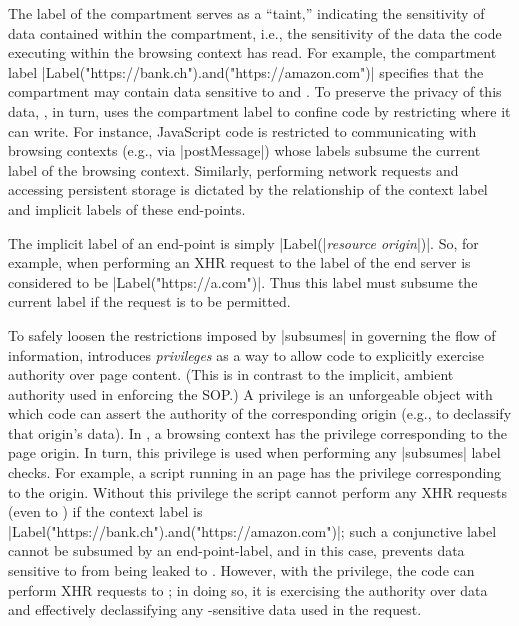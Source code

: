 The label of the compartment serves as a ``taint,'' indicating the
sensitivity of data contained within the compartment, i.e., the
sensitivity of the data the code executing within the browsing context
has read.
%
For example, the compartment label
\js|Label("https://bank.ch").and("https://amazon.com")| specifies that
the compartment may contain data sensitive to  and
.
%
To preserve the privacy of this data, \sys{}, in turn, uses the
compartment label to confine code by restricting where it can write.
%
For  instance, JavaScript code is restricted to communicating with browsing
contexts (e.g., via \js|postMessage|) whose labels subsume the current
label of the browsing context.
%
Similarly, performing network requests and accessing persistent
storage is dictated by the relationship of the context label and
implicit labels of these end-points.  
%

The implicit label of an end-point is simply \js|Label(|\emph{resource
origin}\js|)|.
%
So, for example, when performing an XHR request to  the
label of the end server is considered to be \js|Label("https://a.com")|.
%
Thus this label must subsume the current label if the request is to be
permitted.

To safely loosen the restrictions imposed by \js|subsumes| in
governing the flow of information, \sys{} introduces \emph{privileges}
as a way to allow code to explicitly exercise authority over page
content.
%
(This is in contrast to the implicit, ambient authority used in
enforcing the SOP.)
%
A privilege is an unforgeable object with which code can assert the
authority of the corresponding origin (e.g., to declassify that
origin's data).
%
In \sys, a browsing context has the privilege corresponding to the
page origin.
%
In turn, this privilege is used when performing any \js|subsumes|
label checks.
%
For example, a script running in an  page has the
privilege corresponding to the  origin.
%
Without this privilege the script cannot perform any XHR requests
(even to ) if the context label is
\js|Label("https://bank.ch").and("https://amazon.com")|;
such a conjunctive label cannot be subsumed by an end-point-label, and
in this case, prevents data sensitive to 
from being leaked to .
%
However, with the   privilege, the code can perform
XHR requests to ; in doing so, it is exercising the
authority over  data and effectively declassifying
any -sensitive data used in the request.
%
 
